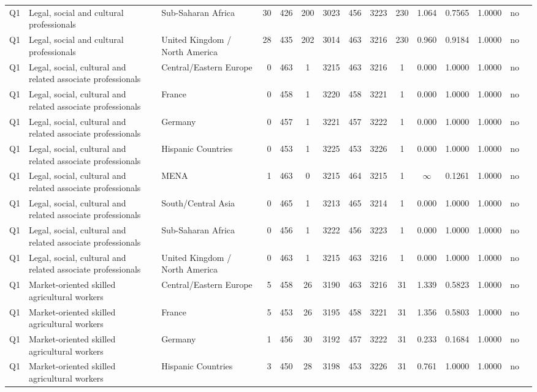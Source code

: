 \begin{longtable}{lllrcccccccccll}
Q1 & Legal, social and cultural professionals & Sub-Saharan Africa & 30 & 426 & 200 & 3023 & 456 & 3223 & 230 & 1.064 & 0.7565 & 1.0000 & no \\
Q1 & Legal, social and cultural professionals & United Kingdom / North America & 28 & 435 & 202 & 3014 & 463 & 3216 & 230 & 0.960 & 0.9184 & 1.0000 & no \\
Q1 & Legal, social, cultural and related associate professionals & Central/Eastern Europe & 0 & 463 & 1 & 3215 & 463 & 3216 & 1 & 0.000 & 1.0000 & 1.0000 & no \\
Q1 & Legal, social, cultural and related associate professionals & France & 0 & 458 & 1 & 3220 & 458 & 3221 & 1 & 0.000 & 1.0000 & 1.0000 & no \\
Q1 & Legal, social, cultural and related associate professionals & Germany & 0 & 457 & 1 & 3221 & 457 & 3222 & 1 & 0.000 & 1.0000 & 1.0000 & no \\
Q1 & Legal, social, cultural and related associate professionals & Hispanic Countries & 0 & 453 & 1 & 3225 & 453 & 3226 & 1 & 0.000 & 1.0000 & 1.0000 & no \\
Q1 & Legal, social, cultural and related associate professionals & MENA & 1 & 463 & 0 & 3215 & 464 & 3215 & 1 & $\infty$ & 0.1261 & 1.0000 & no \\
Q1 & Legal, social, cultural and related associate professionals & South/Central Asia & 0 & 465 & 1 & 3213 & 465 & 3214 & 1 & 0.000 & 1.0000 & 1.0000 & no \\
Q1 & Legal, social, cultural and related associate professionals & Sub-Saharan Africa & 0 & 456 & 1 & 3222 & 456 & 3223 & 1 & 0.000 & 1.0000 & 1.0000 & no \\
Q1 & Legal, social, cultural and related associate professionals & United Kingdom / North America & 0 & 463 & 1 & 3215 & 463 & 3216 & 1 & 0.000 & 1.0000 & 1.0000 & no \\
Q1 & Market-oriented skilled agricultural workers & Central/Eastern Europe & 5 & 458 & 26 & 3190 & 463 & 3216 & 31 & 1.339 & 0.5823 & 1.0000 & no \\
Q1 & Market-oriented skilled agricultural workers & France & 5 & 453 & 26 & 3195 & 458 & 3221 & 31 & 1.356 & 0.5803 & 1.0000 & no \\
Q1 & Market-oriented skilled agricultural workers & Germany & 1 & 456 & 30 & 3192 & 457 & 3222 & 31 & 0.233 & 0.1684 & 1.0000 & no \\
Q1 & Market-oriented skilled agricultural workers & Hispanic Countries & 3 & 450 & 28 & 3198 & 453 & 3226 & 31 & 0.761 & 1.0000 & 1.0000 & no \\

\end{longtable}

